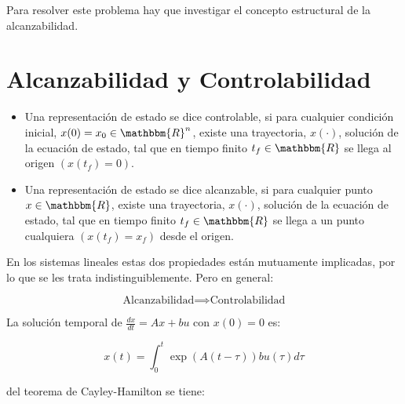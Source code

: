     Para resolver este problema hay que investigar el concepto estructural de la alcanzabilidad.


    \newpage
    \section{Alcanzabilidad y Controlabilidad}

        \begin{itemize}
            \item Una representación de estado se dice controlable, si para cualquier condición inicial, $x(0) = x_0 \in \mathbbm{R}^n$, existe una trayectoria, $x(\cdot)$, solución de la ecuación de estado, tal que en tiempo finito $t_f \in \mathbbm{R}$ se llega al origen $\left( x(t_f) = 0 \right)$.



            \item Una representación de estado se dice alcanzable, si para cualquier punto $x \in \mathbbm{R}$, existe una trayectoria, $x(\cdot)$, solución de la ecuación de estado, tal que en tiempo finito $t_f \in \mathbbm{R}$ se llega a un punto cualquiera $\left( x(t_f) = x_f \right)$ desde el origen.
        \end{itemize}

        En los sistemas lineales estas dos propiedades están mutuamente implicadas, por lo que se les trata indistinguiblemente. Pero en general:

        \begin{equation}
            \text{Alcanzabilidad} \implies \text{Controlabilidad}
        \end{equation}

        La solución temporal de $\frac{dx}{dt} = Ax + bu$ con $x(0) = 0$ es:

        \begin{equation}
            x(t) = \int_0^t \exp{(A(t - \tau))} b u(\tau) d \tau
        \end{equation}

        del teorema de Cayley-Hamilton se tiene:

